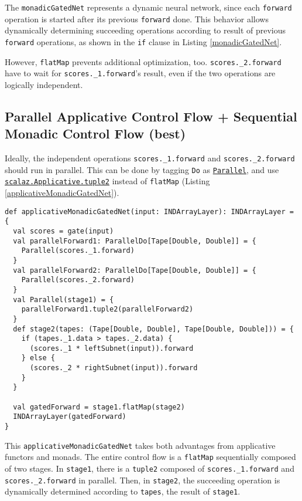 The \lstinline{monadicGatedNet} represents a dynamic neural network, since each \lstinline{forward} operation is started after its previous \lstinline{forward} done. This behavior allows dynamically determining succeeding operations according to result of previous \lstinline{forward} operations, as shown in the \lstinline{if} clause in Listing \ref{monadicGatedNet}.

However, \lstinline{flatMap} prevents additional optimization, too.
\lstinline{scores._2.forward} have to wait for \lstinline{scores._1.forward}'s result, even if the two operations are logically independent.

\subsection{Parallel Applicative Control Flow + Sequential Monadic Control Flow (best)\label{applicative}}

Ideally, the independent operations \lstinline{scores._1.forward} and \lstinline{scores._2.forward} should run in parallel. This can be done by tagging \lstinline{Do} as \href{https://javadoc.io/page/org.scalaz/scalaz_2.11/latest/scalaz/Tags$$Parallel.html}{\lstinline{Parallel}}, and use \href{https://javadoc.io/page/org.scalaz/scalaz_2.11/latest/scalaz/Applicative.htm\l#tuple2[A,B](fa:=>F[A],fb:=>F[B]):F[(A,B)]}{\lstinline{scalaz.Applicative.tuple2}} instead of \lstinline{flatMap} (Listing \ref{applicativeMonadicGatedNet}).

\begin{lstlisting}[float={htbp},caption={Applicative + monadic gated network}, label={applicativeMonadicGatedNet}]
def applicativeMonadicGatedNet(input: INDArrayLayer): INDArrayLayer = {
  val scores = gate(input)
  val parallelForward1: ParallelDo[Tape[Double, Double]] = {
    Parallel(scores._1.forward)
  }
  val parallelForward2: ParallelDo[Tape[Double, Double]] = {
    Parallel(scores._2.forward)
  }
  val Parallel(stage1) = {
  	parallelForward1.tuple2(parallelForward2)
  }
  def stage2(tapes: (Tape[Double, Double], Tape[Double, Double])) = {
    if (tapes._1.data > tapes._2.data) {
      (scores._1 * leftSubnet(input)).forward
    } else {
      (scores._2 * rightSubnet(input)).forward
    }
  }

  val gatedForward = stage1.flatMap(stage2)
  INDArrayLayer(gatedForward)
}
\end{lstlisting}

This \lstinline{applicativeMonadicGatedNet} takes both advantages from applicative functors and monads. The entire control flow is a \lstinline{flatMap} sequentially composed of two stages. In \lstinline{stage1}, there is a \lstinline{tuple2} composed of \lstinline{scores._1.forward} and \lstinline{scores._2.forward} in parallel. Then, in \lstinline{stage2}, the succeeding operation is dynamically determined according to \lstinline{tapes}, the result of \lstinline{stage1}.

